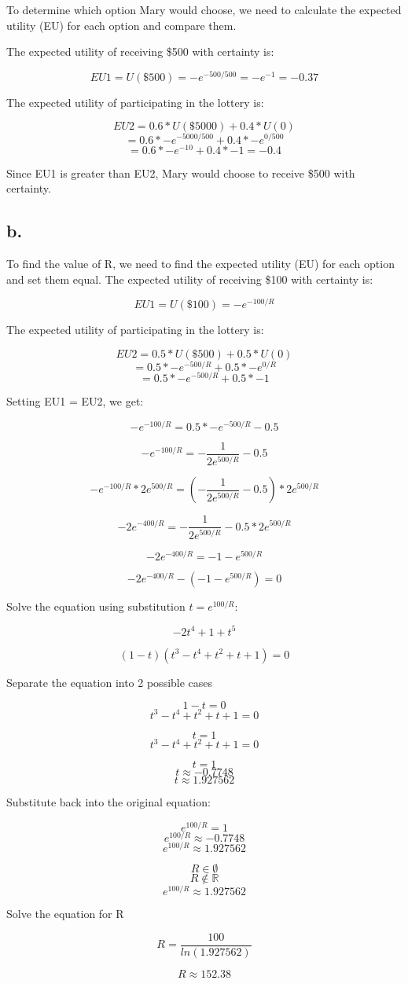 \documentclass{article}
\begin{document}
To determine which option Mary would choose, we need to calculate the expected utility (EU) for each option and compare them.

The expected utility of receiving \$500 with certainty is:

\[EU1 = U(\$500) = -e^{-500/500} = -e^{-1} = -0.37\]

The expected utility of participating in the lottery is:

\[EU2 = 0.6 * U(\$5000) + 0.4 * U(0)\]
\[= 0.6 * -e^{-5000/500} + 0.4 * -e^{0/500}\]
\[= 0.6 * -e^{-10} + 0.4 * -1 = -0.4\]

Since EU1 is greater than EU2, Mary would choose to receive \$500 with certainty.

\subsection*{b.}

To find the value of R, we need to find the expected utility (EU) for each option and set them equal. The expected utility of receiving \$100 with certainty is:

\[EU1 = U(\$100) = -e^{-100/R}\]

The expected utility of participating in the lottery is:

\[EU2 = 0.5 * U(\$500) + 0.5 * U(0)\]
\[= 0.5 * -e^{-500/R} + 0.5 * -e^{0/R}\] 
\[= 0.5 * -e^{-500/R} + 0.5 * -1\]

Setting EU1 = EU2, we get:

\[-e^{-100/R} = 0.5 * -e^{-500/R} -0.5\]

\[-e^{-100/R} = -\dfrac{1}{2e^{500/R}} -0.5\]

\[-e^{-100/R} * 2e^{500/R} = (-\dfrac{1}{2e^{500/R}} -0.5) * 2e^{500/R}\]

\[-2e^{-400/R} = -\dfrac{1}{2e^{500/R}} -0.5 * 2e^{500/R}\]

\[-2e^{-400/R} = -1 - e^{500/R}\]

\[-2e^{-400/R} - (-1 - e^{500/R}) = 0\]

Solve the equation using substitution \(t=e^{100/R}\):

\[-2t^{4} + 1 + t^{5}\]

\[(1 - t)(t^3-t^4+t^2+t+1) = 0\]

Separate the equation into 2 possible cases

\[1 - t = 0\]
\[t^3-t^4+t^2+t+1 = 0\]

\[t = 1\]
\[t^3-t^4+t^2+t+1 = 0\]

\[t = 1\]
\[t \approx -0.7748\]
\[t \approx 1.927562\]

Substitute back into the original equation:

\[e^{100/R} = 1\]
\[e^{100/R} \approx -0.7748\]
\[e^{100/R} \approx 1.927562\]

\[R \in \emptyset\]
\[R \notin \mathbb{R}\]
\[e^{100/R} \approx 1.927562\]

Solve the equation for R

\[R = \dfrac{100}{ln(1.927562)}\]

\[R \approx 152.38\]
\end{document}
